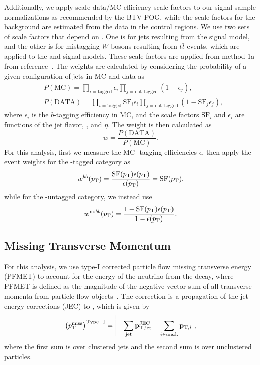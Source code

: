 Additionally, we apply scale data/MC efficiency scale factors to our signal sample normalizations as recommended by the BTV POG, while the scale factors for the background are estimated from the data in the control regions.
We use two sets of scale factors that depend on \ptjet.
One is for \Htobbbar jets resulting from the \WprtoWHtolnubbbar signal model, and the other is for mistagging $W$ bosons resulting from $t\bar{t}$ events, which are applied to the \GBulktoWWtolnuqqbarpr and \WprtoWZtolnuqqbar signal models.
These scale factors are applied from method 1a from reference~\cite{bTaggingEff}.
The weights are calculated by considering the probability of a given configuration of jets in MC and data as
\begin{align}
  & P(\mathrm{MC})=\prod_{i=\text{tagged}}\epsilon_i\prod_{j=\text{not tagged}}(1-\epsilon_j),\\
  & P(\mathrm{DATA})=\prod_{i=\text{tagged}}\mathrm{SF}_i\epsilon_i\prod_{j=\text{not tagged}}(1-\mathrm{SF}_j\epsilon_j),
\end{align}
where $\epsilon_i$ is the $b$-tagging efficiency in MC, and the scale factors $\mathrm{SF}_i$ and $\epsilon_i$ are functions of the jet flavor, \pt, and $\eta$.
The weight is then calculated as
\begin{equation}
  w=\frac{P(\mathrm{DATA})}{P(\mathrm{MC})}.
\end{equation}
For this analysis, first we measure the MC \bbbar-tagging efficiencies $\epsilon$, then apply the event weights for the \bbbar-tagged category as
\begin{equation}
  w^{b\bar{b}}(p_\mathrm{T})=\frac{\mathrm{SF}(p_\mathrm{T})\epsilon(p_\mathrm{T})}{\epsilon(p_\mathrm{T})}=\mathrm{SF}(p_\mathrm{T}),
\end{equation}
while for the \bbbar-untagged category, we instead use
\begin{equation}
  w^{\mathrm{no}b\bar{b}}(p_\mathrm{T})=\frac{1-\mathrm{SF}(p_\mathrm{T})\epsilon(p_\mathrm{T})}{1-\epsilon(p_\mathrm{T})}.
\end{equation}

\subsection{Missing Transverse Momentum}

For this analysis, we use type-I corrected particle flow missing transverse energy (PFMET) to account for the energy of the neutrino from the \Wlep decay, where PFMET is defined as the magnitude of the negative vector sum of all transverse momenta from particle flow objects~\cite{Sirunyan:2019kia}. %
The correction is a propagation of the jet energy corrections (JEC) to \ptmiss, which is given by
\begin{equation}
  \ptmissTI=\vqty{-\sum_\mathrm{jet}\vb{p}_\mathrm{T,jet}^\mathrm{JEC}-\sum_{i\in\mathrm{uncl.}}\vb{p}_{\mathrm{T},i}},
\end{equation}
where the first sum is over clustered jets and the second sum is over unclustered particles.

